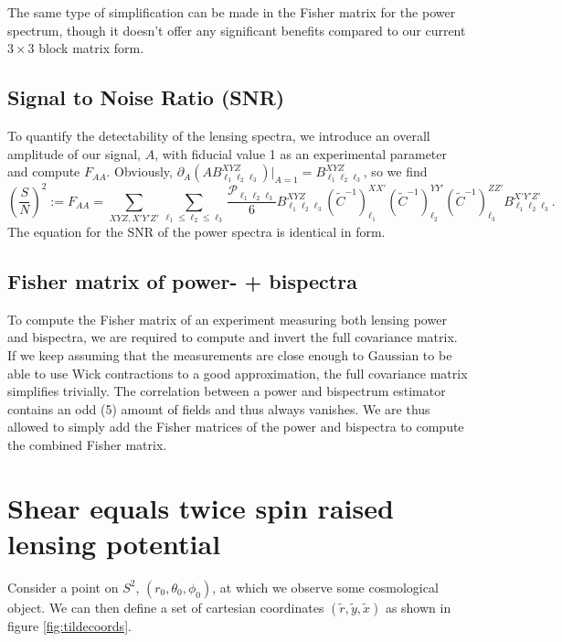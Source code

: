 \documentclass[11pt]{article} %
\newcommand{\br}[1]{\ensuremath{\left( #1 \right)}}
\begin{document}
The same type of simplification can be made in the Fisher matrix for the power spectrum, though it doesn't offer any significant benefits compared to our current $3\times 3$ block matrix form.

\subsection{Signal to Noise Ratio (SNR)}
To quantify the detectability of the lensing spectra, we introduce an overall amplitude of our signal, $A$, with fiducial value 1 as an experimental parameter and compute $F_{AA}$. Obviously, $\partial_A\br{A B^{XYZ}_{\ell_1\ell_2\ell_3}}|_{A=1} = B^{XYZ}_{\ell_1\ell_2\ell_3}$, so we find
\begin{equation*}
    \br{\frac{S}{N}}^2 := F_{AA} =
\sum_{XYZ, X'Y'Z'} \sum_{\ell_1\leq \ell_2 \leq \ell_3} \frac{\mathcal P _{\ell_1\ell_2\ell_3}}{6}
B^{X Y Z}_{\ell_1 \ell_2 \ell_3} 
(\tilde C^{-1})^{X X'}_{\ell_1}
(\tilde C^{-1})^{Y Y'}_{\ell_2}
(\tilde C^{-1})^{Z Z'}_{\ell_3}
B^{X' Y' Z'}_{\ell_1 \ell_2 \ell_3}.
\end{equation*}
The equation for the SNR of the power spectra is identical in form.

\subsection{Fisher matrix of power- + bispectra}
To compute the Fisher matrix of an experiment measuring both lensing power and bispectra, we are required to compute and invert the full covariance matrix. If we keep assuming that the measurements are close enough to Gaussian to be able to use Wick contractions to a good approximation, the full covariance matrix simplifies trivially. The correlation between a power and bispectrum estimator contains an odd (5) amount of fields and thus always vanishes. We are thus allowed to simply add the Fisher matrices of the power and bispectra to compute the combined Fisher matrix.  

\section{Shear equals twice spin raised lensing potential}\label{sec:shear}

Consider a point on $S^2$, $(r_0, \theta_0, \phi_0)$, at which we observe some cosmological object. We can then define a set of cartesian coordinates $(\tilde r, \tilde y, \tilde x)$ as shown in figure \ref{fig:tildecoords}.
\end{document}
